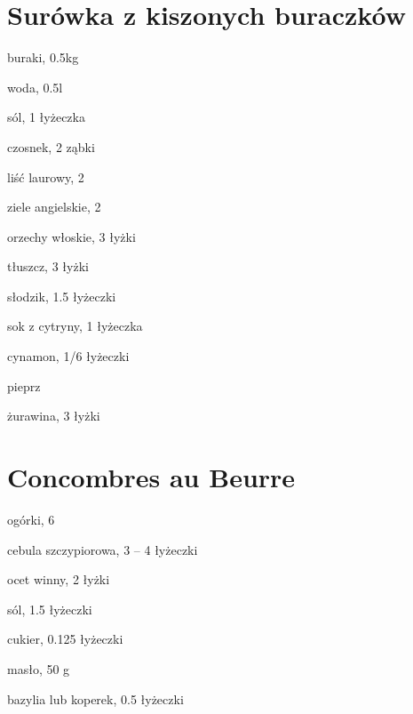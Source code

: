 \commentskip


\recipend

\section{Surówka z kiszonych buraczków}

\begin{ingreds}
\item{buraki, 0.5kg}
\item{woda, 0.5l}
\item{sól, 1 łyżeczka}
\item{czosnek, 2 ząbki}
\item{liść laurowy, 2}
\item{ziele angielskie, 2}
\item{orzechy włoskie, 3 łyżki}
\item{tłuszcz, 3 łyżki}
\item{słodzik, 1.5 łyżeczki}
\item{sok z cytryny, 1 łyżeczka}
\item{cynamon, 1/6 łyżeczki}
\item{pieprz}
\item{żurawina, 3 łyżki}
\end{ingreds}


\commentskip

\recipend

\section{Concombres au Beurre}

\begin{ingreds}
\item{ogórki, 6}
\item{cebula szczypiorowa, 3 -- 4 łyżeczki}
\item{ocet winny, 2 łyżki}
\item{sól, 1.5 łyżeczki}
\item{cukier, 0.125 łyżeczki}
\item{masło, 50 g}
\item{bazylia lub koperek, 0.5 łyżeczki}
\end{ingreds}


